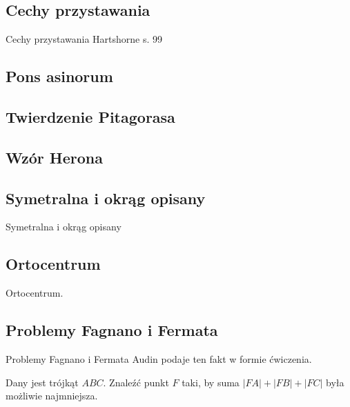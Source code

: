 

\subsection{Cechy przystawania}
Cechy przystawania
\loremipsum
Hartshorne s. 99

\subsection{Pons asinorum}




\subsection{Twierdzenie Pitagorasa}


\subsection{Wzór Herona}


\subsection{Symetralna i okrąg opisany}
Symetralna i okrąg opisany
\loremipsum

\subsection{Ortocentrum}
Ortocentrum.
\loremipsum

\subsection{Problemy Fagnano i Fermata}
Problemy Fagnano i Fermata %
Audin \cite[s. 101]{audin_2003} podaje ten fakt w formie ćwiczenia.

\begin{problem}
	Dany jest trójkąt $ABC$.
	Znaleźć punkt $F$ taki, by suma $|FA| + |FB| + |FC|$ była możliwie najmniejsza.
%
\end{problem}

